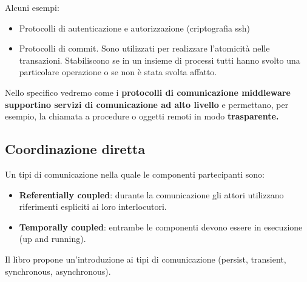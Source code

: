 \documentclass[12pt]{article}
\begin{document}
		Alcuni esempi:
		\begin{itemize}
			\item Protocolli di autenticazione e autorizzazione (criptografia ssh)
			\item Protocolli di commit. Sono utilizzati per realizzare l'atomicità nelle transazioni. Stabiliscono se in un insieme di processi tutti hanno svolto una particolare operazione o se non è stata svolta affatto.
		\end{itemize}
		Nello specifico vedremo come i \textbf{protocolli di comunicazione middleware supportino servizi di comunicazione ad alto livello} e permettano, per esempio, la chiamata a procedure o oggetti remoti in modo \textbf{trasparente.}
			 
	\subsection{Coordinazione diretta}	
		Un tipi di comunicazione nella quale le componenti partecipanti sono:
		\begin{itemize}
			\item \textbf{Referentially coupled}: durante la comunicazione gli attori utilizzano riferimenti espliciti ai loro interlocutori.
			\item \textbf{Temporally coupled}: entrambe le componenti devono essere in esecuzione (up and running).	
		\end{itemize}
		Il libro propone un'introduzione ai tipi di comunicazione (persist, transient, synchronous, asynchronous).
		
\end{document}
